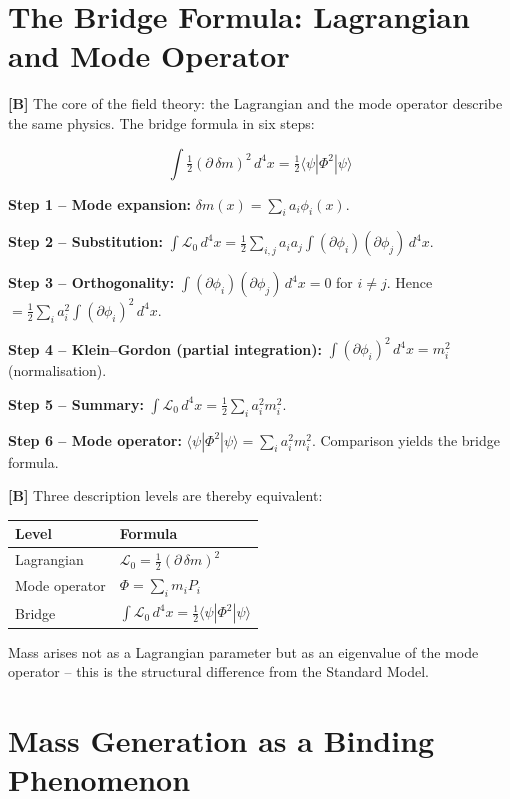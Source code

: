 \section{The Bridge Formula: Lagrangian and Mode Operator}

\textbf{[B]} The core of the field theory: the Lagrangian and the mode operator
describe the same physics. The bridge formula in six steps:

\[
  \boxed{\;
    \int\tfrac12(\partial\,\delta m)^2\,d^4x
    = \tfrac12\langle\psi|\Phi^2|\psi\rangle
  \;}
\]

\textbf{Step 1 -- Mode expansion:}
$\delta m(x) = \sum_i a_i\phi_i(x)$.

\textbf{Step 2 -- Substitution:}
$\int\mathcal L_0\,d^4x
= \tfrac12\sum_{i,j}a_ia_j\int(\partial\phi_i)(\partial\phi_j)\,d^4x$.

\textbf{Step 3 -- Orthogonality:}
$\int(\partial\phi_i)(\partial\phi_j)\,d^4x=0$ for $i\neq j$.
Hence $= \tfrac12\sum_ia_i^2\int(\partial\phi_i)^2\,d^4x$.

\textbf{Step 4 -- Klein--Gordon (partial integration):}
$\int(\partial\phi_i)^2\,d^4x = m_i^2$ (normalisation).

\textbf{Step 5 -- Summary:}
$\int\mathcal L_0\,d^4x = \tfrac12\sum_ia_i^2 m_i^2$.

\textbf{Step 6 -- Mode operator:}
$\langle\psi|\Phi^2|\psi\rangle = \sum_ia_i^2 m_i^2$.
Comparison yields the bridge formula.

\textbf{[B]} Three description levels are thereby equivalent:

\begin{center}
\renewcommand{\arraystretch}{1.3}
{\small
\begin{tabular}{ll}
\toprule
Level & Formula \\
\midrule
Lagrangian     & $\mathcal L_0 = \tfrac12(\partial\,\delta m)^2$ \\
Mode operator  & $\Phi = \sum_i m_i P_i$ \\
Bridge         & $\int\mathcal L_0\,d^4x = \tfrac12\langle\psi|\Phi^2|\psi\rangle$ \\
\bottomrule
\end{tabular}
}
\renewcommand{\arraystretch}{1.0}
\end{center}

Mass arises not as a Lagrangian parameter but as an eigenvalue of the mode
operator -- this is the structural difference from the Standard Model.

\section{Mass Generation as a Binding Phenomenon}

